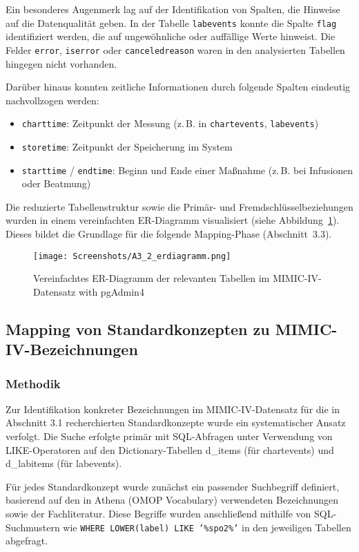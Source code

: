 \documentclass[12pt]{article}
\begin{document}
Ein besonderes Augenmerk lag auf der Identifikation von Spalten, die Hinweise auf die Datenqualität geben. In der Tabelle \texttt{labevents} konnte die Spalte \texttt{flag} identifiziert werden, die auf ungewöhnliche oder auffällige Werte hinweist. Die Felder \texttt{error}, \texttt{iserror} oder \texttt{canceledreason} waren in den analysierten Tabellen hingegen nicht vorhanden.

Darüber hinaus konnten zeitliche Informationen durch folgende Spalten eindeutig nachvollzogen werden:
\begin{itemize}
    \item \texttt{charttime}: Zeitpunkt der Messung (z.\,B. in \texttt{chartevents}, \texttt{labevents})
    \item \texttt{storetime}: Zeitpunkt der Speicherung im System
    \item \texttt{starttime} / \texttt{endtime}: Beginn und Ende einer Maßnahme (z.\,B. bei Infusionen oder Beatmung)
\end{itemize}

Die reduzierte Tabellenstruktur sowie die Primär- und Fremdschlüsselbeziehungen wurden in einem vereinfachten ER-Diagramm visualisiert (siehe Abbildung~\ref{fig:erdiagramm}). Dieses bildet die Grundlage für die folgende Mapping-Phase (Abschnitt~3.3).

\begin{figure}[H]
\centering
\texttt{[image: Screenshots/A3\_2\_erdiagramm.png]}
\caption{Vereinfachtes ER-Diagramm der relevanten Tabellen im MIMIC-IV-Datensatz with pgAdmin4}
\label{fig:erdiagramm}
\end{figure}



\subsection{Mapping von Standardkonzepten zu MIMIC-IV-Bezeichnungen }

\subsubsection{Methodik}
Zur Identifikation konkreter Bezeichnungen im MIMIC-IV-Datensatz für die in Abschnitt 3.1 recherchierten Standardkonzepte wurde ein systematischer Ansatz verfolgt. Die Suche erfolgte primär mit SQL-Abfragen unter Verwendung von LIKE-Operatoren auf den Dictionary-Tabellen d\_items (für chartevents) und d\_labitems (für labevents).

Für jedes Standardkonzept wurde zunächst ein passender Suchbegriff definiert, basierend auf den in Athena (OMOP Vocabulary) verwendeten Bezeichnungen sowie der Fachliteratur. Diese Begriffe wurden anschließend mithilfe von SQL-Suchmustern wie \texttt{WHERE LOWER(label) LIKE '\%spo2\%'} in den jeweiligen Tabellen abgefragt.
\end{document}
